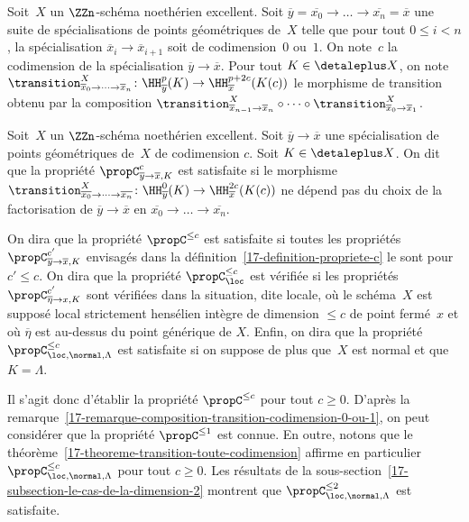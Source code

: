 \documentclass[10pt]{../fichiers-configuration-latex/smfart}
\begin{document}
\begin{definition2}
Soit $X$ un $\ZZn$-schéma noethérien excellent.
Soit $\overline y=\overline {x_0}\to \dots \to \overline {x_n}=\overline x$ une
suite de spécialisations de points géométriques de $X$ telle que pour tout
$0\leq i<n$, la spécialisation $\overline x_i\to \overline x_{i+1}$ soit de
codimension $0$ ou $1$. On note $c$ la codimension de la spécialisation
$\overline y\to \overline x$.
Pour tout $K\in\detaleplus X$, on
note $\transition^X_{\overline x_0\to\dots \to
\overline x_n}\colon \HH^p_{\overline y}(K)\to 
\HH^{p+2c}_{\overline x}(K(c))$ le morphisme de transition obtenu par la
composition
$\transition^X_{\overline x_{n-1}\to\overline x_n}\circ\dots\circ \transition^X_{\overline x_0\to\overline x_1}$.
\end{definition2}

\begin{definition2}\label{17-definition-propriete-c}
Soit $X$ un $\ZZn$-schéma noethérien excellent. Soit $\overline y\to
\overline x$ une spécialisation de points géométriques de $X$ de
codimension $c$. Soit $K\in\detaleplus X$. On dit que la propriété
$\propC^c_{\overline y\to \overline x,K}$ est satisfaite si le morphisme
$\transition^X_{\overline {x_0}\to\dots\to\overline {x_n}}\colon
\HH^0_{\overline y}(K)\to \HH^{2c}_{\overline x}(K(c))$
ne dépend pas du choix de la factorisation de $\overline y\to\overline x$
en $\overline {x_0}\to\dots\to\overline {x_n}$.
\end{definition2}

\begin{definition2}
On dira que la propriété $\propC^{\leq c}$ est satisfaite si toutes les
propriétés $\propC^{c'}_{\overline y\to\overline x,K}$ envisagés dans
la définition~\ref{17-definition-propriete-c} le sont pour $c'\leq c$.
On dira que la
propriété $\propC^{\leq c}_{\loc}$ est vérifiée si les propriétés
$\propC^{c'}_{\overline \eta\to x,K}$ sont vérifiées 
dans la situation, dite locale, où le schéma $X$ est supposé 
local strictement hensélien intègre de dimension $\leq c$
de point fermé $x$ et où $\overline \eta$ est au-dessus du point générique
de $X$. Enfin, on dira que la propriété $\propC^{\leq
c}_{\loc,\normal,\Lambda}$ est satisfaite si on suppose de plus que $X$ est
normal et que $K=\Lambda$.
\end{definition2}

Il s'agit donc d'établir la propriété $\propC^{\leq c}$ pour tout $c\geq
0$. D'après la
remarque~\ref{17-remarque-composition-transition-codimension-0-ou-1}, on peut
considérer que la propriété $\propC^{\leq 1}$ est connue. En outre, notons
que le théorème~\ref{17-theoreme-transition-toute-codimension} affirme en
particulier $\propC^{\leq c}_{\loc,\normal,\Lambda}$ pour tout $c\geq 0$. Les
résultats de la sous-section~\ref{17-subsection-le-cas-de-la-dimension-2}
montrent que $\propC^{\leq 2}_{\loc,\normal,\Lambda}$ est satisfaite.
\end{document}
